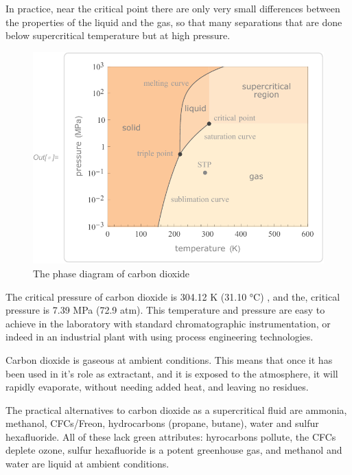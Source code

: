 \begin{todo} 
In practice, near the critical point there are only very small differences
between the properties of the liquid and the gas, so that many separations that
are done below supercritical temperature but at high pressure.
\end{todo}

\begin{figure}
\centering
\includegraphics[width=\textwidth]{Figures/CO2PhaseDiagram}
\decoRule
\caption[The carbon dioxide phase diagram]{The phase diagram of carbon dioxide}
\label{fig:co2phase}
\end{figure}

The critical pressure of carbon dioxide is 304.12 K (31.10 °C) , and the,
critical pressure is 7.39 MPa (72.9 atm). This temperature and pressure are easy
to achieve in the laboratory with standard chromatographic instrumentation, or
indeed in an industrial plant with using process engineering technologies.

Carbon dioxide is gaseous at ambient conditions. This means that once it has
been used in it's role as extractant, and it is exposed to the atmosphere, it
will rapidly evaporate, without needing added heat, and leaving no residues.

The practical alternatives to carbon dioxide as a supercritical fluid are
ammonia, methanol, CFCs/Freon, hydrocarbons (propane, butane), water and sulfur
hexafluoride. All of these lack green attributes: hyrocarbons pollute, the CFCs
deplete ozone, sulfur hexafluoride is a potent greenhouse gas, and methanol and
water are liquid at ambient conditions.

